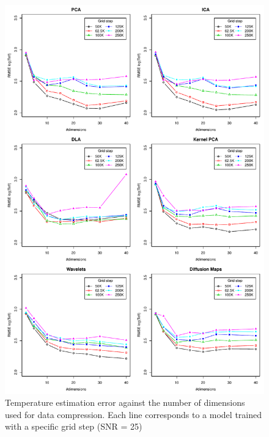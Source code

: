 \documentclass[a4paper,fleqn,usenatbib]{mnras}
\begin{document}
\begin{figure}
\centering\includegraphics[height=0.95\textheight]{bestSVM_Teff_N-RMSE_HR10_snr=25_all.pdf}
\caption{Temperature estimation error against the number of dimensions
  used for data compression. Each line corresponds to a model trained
  with a specific grid step (SNR = 25)}
\label{fig:grid25}
\end{figure}
\end{document}
